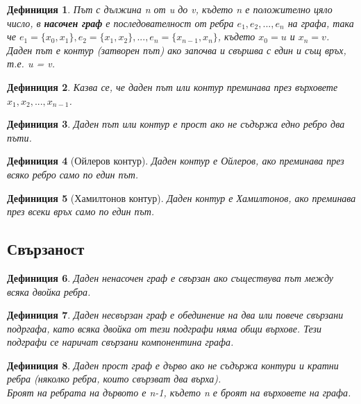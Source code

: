 \documentclass[fleqn, 12pt]{article}
\newtheorem{definition}{Дефиниция}[subsection]
\theoremstyle{definition}
\begin{document}
\begin{definition}
Път с дължина n от u до v, където n е положително цяло число, в \textbf{насочен граф} е последователност от ребра $e_1, e_2, ..., e_n$ на графа, така че $e_1= \{x_0, x_1\}, e_2= \{x_1, x_2\}, ..., e_n= \{x_{n-1}, x_n\}$, където $x_0= u$ и $x_n= v$.\\
Даден път е контур (затворен път) ако започва и свършва с един и същ връх, т.е. u = v. 
\end{definition}

\begin{definition}
Казва се, че даден път или контур преминава през върховете $x_1, x_2, ..., x_{n-1}$.
\end{definition}

\begin{definition}
Даден път или контур е прост ако не съдържа едно ребро два пъти.
\end{definition}

\begin{definition}[Ойлеров контур]
Даден контур е Ойлеров, ако преминава през всяко ребро само по един път. 
\end{definition}

\begin{definition}[Хамилтонов контур]
Даден контур е Хамилтонов, ако преминава през всеки връх само по един път. 
\end{definition}

\subsection{Свързаност}
\begin{definition}
Даден ненасочен граф е свързан ако съществува път между всяка двойка ребра.
\end{definition}

\begin{definition}
Даден несвързан граф е обединение на два или повече свързани подргафа, като всяка двойка от тези подграфи няма общи върхове. Тези подграфи се наричат свързани компонентина графа.
\end{definition}

\begin{definition}
Даден прост граф е дърво ако не съдържа контури и кратни ребра (няколко ребра, които свързват два върха).\\
Броят на ребрата на дървото е n-1, където n е броят на върховете на графа.
\end{definition}
\end{document}

